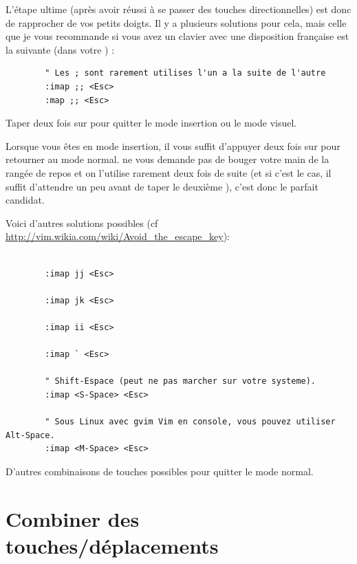 L'étape ultime (après avoir réussi à se passer des touches directionnelles) est donc de rapprocher \ttesc de vos petits doigts. Il y a plusieurs solutions pour cela, mais celle que je vous recommande si vous avez un clavier avec une disposition française est la suivante (dans votre \vimrc) :

\begin{listing}[H]

    \begin{verbatim}
        " Les ; sont rarement utilises l'un a la suite de l'autre
        :imap ;; <Esc>
        :map ;; <Esc>
    \end{verbatim}
    \caption{Taper deux fois sur \hlred{;} pour quitter le mode insertion ou le mode visuel.}
    \label{code:avoid-esc}
\end{listing}

Lorsque vous êtes en mode insertion, il vous suffit d'appuyer deux fois sur \ttsemicolon pour retourner au mode normal. \ttsemicolon ne vous demande pas de bouger votre main de la rangée de repos et on l'utilise rarement deux fois de suite (et si c'est le cas, il suffit d'attendre un peu avant de taper le deuxième \tsemicolon), c'est donc le parfait candidat.

Voici d'autres solutions possibles (cf \url{http://vim.wikia.com/wiki/Avoid_the_escape_key}):

\begin{listing}[H]
    \begin{verbatim}

        :imap jj <Esc>

        :imap jk <Esc>

        :imap ii <Esc>

        :imap ` <Esc>

        " Shift-Espace (peut ne pas marcher sur votre systeme).
        :imap <S-Space> <Esc>

        " Sous Linux avec gvim Vim en console, vous pouvez utiliser Alt-Space.
        :imap <M-Space> <Esc>
    \end{verbatim}
    \caption{D'autres combinaisons de touches possibles pour quitter le mode normal.}
    \label{code:avoid-esc-alt}
\end{listing}

\section{Combiner des touches/déplacements}
\label{sec:combine-move}

